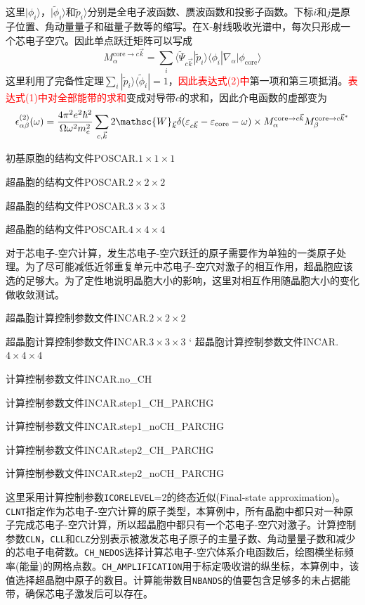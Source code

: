 这里$|\phi_i\rangle$，$|\tilde{\phi}_i\rangle$和$\tilde p_i\rangle$分别是全电子波函数、赝波函数和投影子函数。下标$i$和$j$是原子位置、角动量量子和磁量子数等的缩写。在\textrm{X}-射线吸收光谱中，每次只形成一个芯电子空穴。因此单点跃迁矩阵可以写成
\begin{displaymath}
	M_{\alpha}^{\mathrm{core}\rightarrow c\vec k}=\sum_i\langle\tilde{\Psi}_{c\vec k}|\tilde p_i\rangle\langle\phi_i|\nabla_{\alpha}|\phi_{\mathrm{core}}\rangle
\end{displaymath}
这里利用了完备性定理$\sum\limits_i|\tilde p_i\rangle\langle\tilde{\phi}_i|=1$，\textcolor{red}{因此表达式(2)中}第一项和第三项抵消。\textcolor{red}{表达式(1)中对全部能带的求和}变成对导带$c$的求和，因此介电函数的虚部变为
\begin{displaymath}
	\epsilon_{\alpha\beta}^{(2)}(\omega)=\dfrac{4\pi^2e^2\hbar^2}{\Omega\omega^2m_e^2}\sum_{c,\vec k}2\mathsc{W}_{\vec k}\delta(\varepsilon_{c\vec k}-\varepsilon_{\mathrm{core}}-\omega)\times M_{\alpha}^{\mathrm{core}\rightarrow c\vec k}M_{\beta}^{\mathrm{core}\rightarrow c\vec k^{\ast}}
\end{displaymath}

初基原胞的结构文件\textrm{POSCAR.$1\times1\times1$}

超晶胞的结构文件\textrm{POSCAR.$2\times2\times2$}

超晶胞的结构文件\textrm{POSCAR.$3\times3\times3$}

超晶胞的结构文件\textrm{POSCAR.$4\times4\times4$}

对于芯电子-空穴计算，发生芯电子-空穴跃迁的原子需要作为单独的一类原子处理。为了尽可能减低近邻重复单元中芯电子-空穴对激子的相互作用，超晶胞应该选的足够大。为了定性地说明晶胞大小的影响，这里对相互作用随晶胞大小的变化做收敛测试。

超晶胞计算控制参数文件\textrm{INCAR.$2\times2\times2$}

超晶胞计算控制参数文件\textrm{INCAR.$3\times3\times3$}
`
超晶胞计算控制参数文件\textrm{INCAR.$4\times4\times4$}

计算控制参数文件\textrm{INCAR.no\_CH}

计算控制参数文件\textrm{INCAR.step1\_CH\_PARCHG}

计算控制参数文件\textrm{INCAR.step1\_noCH\_PARCHG}

计算控制参数文件\textrm{INCAR.step2\_CH\_PARCHG}

计算控制参数文件\textrm{INCAR.step2\_noCH\_PARCHG}

这里采用计算控制参数\texttt{ICORELEVEL}=2的终态近似\textrm{(Final-state approximation)}。\texttt{CLNT}指定作为芯电子-空穴计算的原子类型，本算例中，所有晶胞中都只对一种原子完成芯电子-空穴计算，所以超晶胞中都只有一个芯电子-空穴对激子。计算控制参数\texttt{CLN}，\texttt{CLL}和\texttt{CLZ}分别表示被激发芯电子原子的主量子数、角动量量子数和减少的芯电子电荷数。\texttt{CH\_NEDOS}选择计算芯电子-空穴体系介电函数后，绘图横坐标频率(能量)的网格点数。\texttt{CH\_AMPLIFICATION}用于标定吸收谱的纵坐标，本算例中，该值选择超晶胞中原子的数目。计算能带数目\texttt{NBANDS}的值要包含足够多的未占据能带，确保芯电子激发后可以存在。

